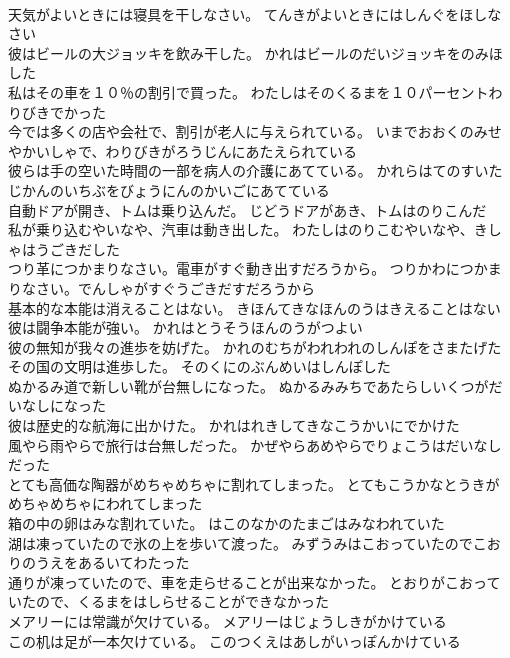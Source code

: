\documentclass[8pt]{extreport}
\begin{document}
\begin{CJK}{UTF8}{min}
\\	天気がよいときには寝具を干しなさい。	てんきがよいときにはしんぐをほしなさい 
\\	彼はビールの大ジョッキを飲み干した。	かれはビールのだいジョッキをのみほした 
\\	私はその車を１０％の割引で買った。	わたしはそのくるまを１０パーセントわりびきでかった 
\\	今では多くの店や会社で、割引が老人に与えられている。	いまでおおくのみせやかいしゃで、わりびきがろうじんにあたえられている 
\\	彼らは手の空いた時間の一部を病人の介護にあてている。	かれらはてのすいたじかんのいちぶをびょうにんのかいごにあてている 
\\	自動ドアが開き、トムは乗り込んだ。	じどうドアがあき、トムはのりこんだ 
\\	私が乗り込むやいなや、汽車は動き出した。	わたしはのりこむやいなや、きしゃはうごきだした 
\\	つり革につかまりなさい。電車がすぐ動き出すだろうから。	つりかわにつかまりなさい。でんしゃがすぐうごきだすだろうから 
\\	基本的な本能は消えることはない。	きほんてきなほんのうはきえることはない 
\\	彼は闘争本能が強い。	かれはとうそうほんのうがつよい 
\\	彼の無知が我々の進歩を妨げた。	かれのむちがわれわれのしんぽをさまたげた 
\\	その国の文明は進歩した。	そのくにのぶんめいはしんぽした 
\\	ぬかるみ道で新しい靴が台無しになった。	ぬかるみみちであたらしいくつがだいなしになった 
\\	彼は歴史的な航海に出かけた。	かれはれきしてきなこうかいにでかけた 
\\	風やら雨やらで旅行は台無しだった。	かぜやらあめやらでりょこうはだいなしだった 
\\	とても高価な陶器がめちゃめちゃに割れてしまった。	とてもこうかなとうきがめちゃめちゃにわれてしまった 
\\	箱の中の卵はみな割れていた。	はこのなかのたまごはみなわれていた 
\\	湖は凍っていたので氷の上を歩いて渡った。	みずうみはこおっていたのでこおりのうえをあるいてわたった 
\\	通りが凍っていたので、車を走らせることが出来なかった。	とおりがこおっていたので、くるまをはしらせることができなかった 
\\	メアリーには常識が欠けている。	メアリーはじょうしきがかけている 
\\	この机は足が一本欠けている。	このつくえはあしがいっぽんかけている 

\end{CJK}
\end{document}
